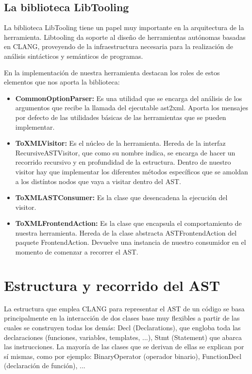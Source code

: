 \subsection{La biblioteca LibTooling}

La biblioteca LibTooling tiene un papel muy importante en la arquitectura de la herramienta. Libtooling da soporte al dise\~no de herramientas aut\'onomas basadas en CLANG, proveyendo de la infraestructura necesaria para la realizaci\'on de an\'alisis sint\'acticos y sem\'anticos de programas.

En la implementaci\'on de nuestra herramienta destacan los roles de estos elementos que nos aporta la biblioteca:

\begin{itemize}
\item \textbf{CommonOptionParser:} Es una utilidad que se encarga del an\'alisis de
los argumentos que recibe la llamada del ejecutable ast2xml. Aporta los
mensajes por defecto de las utilidades b\'asicas de las herramientas que
se pueden implementar.
\item \textbf{ToXMLVisitor:} Es el n\'ucleo de la herramienta. Hereda de la interfaz RecursiveASTVisitor, que como su nombre indica, se encarga de hacer un recorrido recursivo y en profundidad de la estructura. Dentro de nuestro visitor hay que implementar los diferentes m\'etodos espec\'ificos que se amoldan a los dist\'intos nodos que vaya a visitar dentro del AST.
\item \textbf{ToXMLASTConsumer:} Es la clase que desencadena la ejecuci\'on del visitor.
\item \textbf{ToXMLFrontendAction:} Es la clase que encapsula el comportamiento de nuestra herramienta. Hereda de la clase abstracta ASTFrontendAction del paquete FrontendAction. Devuelve una instancia de nuestro consumidor en el momento de comenzar a recorrer el AST.
\end{itemize}

\section{Estructura y recorrido del AST}

La estructura que emplea CLANG para representar el AST de un c\'odigo se basa principalmente en la interacci\'on de dos clases base muy flexibles a partir de las cuales se construyen todas los dem\'as: Decl (Declarations), que engloba toda las declaraciones (funciones, variables, templates, \etc ...), Stmt (Statement) que abarca las instrucciones. La mayor\'ia de las clases que se derivan de ellas se explican por s\'i mismas, como por ejemplo: BinaryOperator (operador binario), FunctionDecl (declaraci\'on de funci\'on), \etc ...

